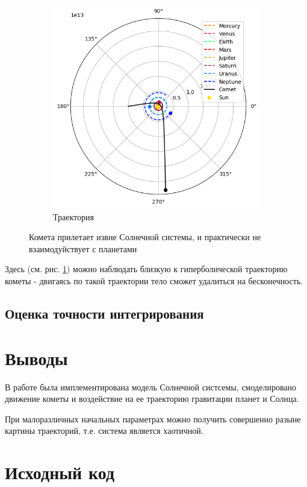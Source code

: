 \begin{figure}[H]
\begin{subfigure}{0.49\linewidth}
		\includegraphics[width=1\linewidth]{imgs_8/trjRunBy.png}
		\caption{Траектория}
    \end{subfigure}
	\caption{Комета прилетает извне Солнечной системы, и практически
	не взаимодуйствует с планетами}
    \label{fig:RunBy}
\end{figure}
Здесь (см. рис. \ref{fig:RunBy}) можно наблюдать близкую к гиперболической траекторию кометы -
двигаясь по такой траектории тело сможет удалиться на бесконечность.
\subsection{Оценка точности интегрирования}

\section{Выводы}
В работе была имплементирована модель Солнечной систсемы, смоделировано движение кометы
и воздействие на ее траекторию гравитации планет и Солнца. 

При малоразличных начальных параметрах можно получить совершенно разыне картины траекторий,
т.е. система является хаотичной.


\newpage
\section{Исходный код}





